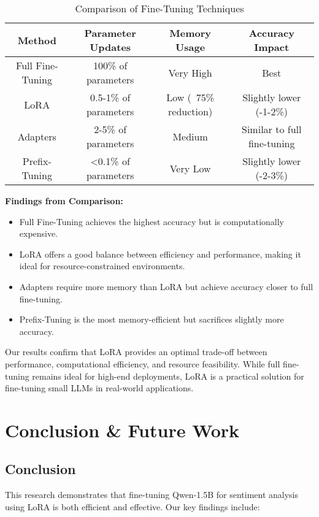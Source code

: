 \documentclass{article} %
\begin{document}
\begin{flushleft}
\begin{table}[h]
\centering
\begin{tabular}{|c|c|c|c|}
\hline
\textbf{Method} & \textbf{Parameter Updates} & \textbf{Memory Usage} & \textbf{Accuracy Impact} \\
\hline
Full Fine-Tuning & 100\% of parameters & Very High & Best \\
LoRA & 0.5-1\% of parameters & Low (~75\% reduction) & Slightly lower (-1-2\%) \\
Adapters & 2-5\% of parameters & Medium & Similar to full fine-tuning \\
Prefix-Tuning & <0.1\% of parameters & Very Low & Slightly lower (-2-3\%) \\
\hline
\end{tabular}
\caption{Comparison of Fine-Tuning Techniques}
\label{tab:peft_comparison}
\end{table}

\textbf{Findings from Comparison:}
\begin{itemize}
    \item Full Fine-Tuning achieves the highest accuracy but is computationally expensive.
    \item LoRA offers a good balance between efficiency and performance, making it ideal for resource-constrained environments.
    \item Adapters require more memory than LoRA but achieve accuracy closer to full fine-tuning.
    \item Prefix-Tuning is the most memory-efficient but sacrifices slightly more accuracy.
\end{itemize}

Our results confirm that LoRA provides an optimal trade-off between performance, computational efficiency, and resource feasibility. While full fine-tuning remains ideal for high-end deployments, LoRA is a practical solution for fine-tuning small LLMs in real-world applications.


\section{Conclusion \& Future Work}

\subsection{Conclusion}
This research demonstrates that fine-tuning Qwen-1.5B for sentiment analysis using LoRA is both efficient and effective. Our key findings include:


\end{flushleft}
\end{document}
